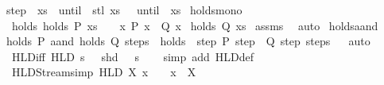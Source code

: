 \begin{isabellebody}
{\isacharbar}\isanewline
step{\isacharcolon}\ {\isachardoublequoteopen}{\isasymlbrakk}{\isasymphi}\ xs{\isacharsemicolon}\ {\isacharparenleft}{\isasymphi}\ until\ {\isasympsi}{\isacharparenright}\ {\isacharparenleft}stl\ xs{\isacharparenright}{\isasymrbrakk}\ {\isasymLongrightarrow}\ {\isacharparenleft}{\isasymphi}\ until\ {\isasympsi}{\isacharparenright}\ xs{\isachardoublequoteclose}\isanewline
\isanewline
{}\isamarkupfalse%
\isanewline
\isanewline
{}\isamarkupfalse%
\ holds{\isacharunderscore}mono{\isacharcolon}\isanewline
{}\ holds{\isacharcolon}\ {\isachardoublequoteopen}holds\ P\ xs{\isachardoublequoteclose}\ \ {}{\isacharcolon}\ {\isachardoublequoteopen}{\isasymAnd}\ x{\isachardot}\ P\ x\ {\isasymLongrightarrow}\ Q\ x{\isachardoublequoteclose}\isanewline
{}\ {\isachardoublequoteopen}holds\ Q\ xs{\isachardoublequoteclose}\isanewline
%
\isadelimproof
%
\endisadelimproof
%
\isatagproof
{}\isamarkupfalse%
\ assms\ \isamarkupfalse%
\ auto%
\endisatagproof
{\isafoldproof}%
%
\isadelimproof
\isanewline
%
\endisadelimproof
\isanewline
{}\isamarkupfalse%
\ holds{\isacharunderscore}aand{\isacharcolon}\isanewline
{\isachardoublequoteopen}{\isacharparenleft}holds\ P\ aand\ holds\ Q{\isacharparenright}\ steps\ {\isasymlongleftrightarrow}\ holds\ {\isacharparenleft}{\isasymlambda}\ step{\isachardot}\ P\ step\ {\isasymand}\ Q\ step{\isacharparenright}\ steps{\isachardoublequoteclose}%
\isadelimproof
\ %
\endisadelimproof
%
\isatagproof
{}\isamarkupfalse%
\ auto%
\endisatagproof
{\isafoldproof}%
%
\isadelimproof
%
\endisadelimproof
\isanewline
\isanewline
{}\isamarkupfalse%
\ HLD{\isacharunderscore}iff{\isacharcolon}\ {\isachardoublequoteopen}HLD\ s\ {\isasymomega}\ {\isasymlongleftrightarrow}\ shd\ {\isasymomega}\ {\isasymin}\ s{\isachardoublequoteclose}\isanewline
%
\isadelimproof
\ \ %
\endisadelimproof
%
\isatagproof
{}\isamarkupfalse%
\ {\isacharparenleft}simp\ add{\isacharcolon}\ HLD{\isacharunderscore}def{\isacharparenright}%
\endisatagproof
{\isafoldproof}%
%
\isadelimproof
\isanewline
%
\endisadelimproof
\isanewline
{}\isamarkupfalse%
\ HLD{\isacharunderscore}Stream{\isacharbrackleft}simp{\isacharbrackright}{\isacharcolon}\ {\isachardoublequoteopen}HLD\ X\ {\isacharparenleft}x\ {\isacharhash}{\isacharhash}\ {\isasymomega}{\isacharparenright}\ {\isasymlongleftrightarrow}\ x\ {\isasymin}\ X{\isachardoublequoteclose}\isanewline
%
\isadelimproof
\ \ %
\endisadelimproof

\end{isabellebody}
